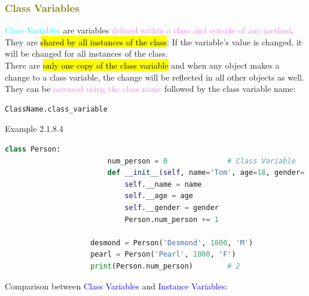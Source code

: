 \documentclass{book}
\begin{document}
    \textcolor{olive}{\subsubsection{Class Variables}}
    \textcolor{cyan}{Class Variables} are variables \textcolor{violet}{defined within a class and outside of any method}.\\
    They are \hl{shared by all instances of the class}: If the variable's value is changed, it will be changed for all instances of the class.\\
    There are \hl{only one copy of the class variable} and when any object makes a change to a class variable, the change will be reflected in all other objects as well.\\
    They can be \textcolor{violet}{accessed using the class name} followed by the class variable name:
    \begin{lstlisting}[language=Python, basicstyle=\ttfamily\small, keywordstyle=\color{blue}, commentstyle=\color{forestgreen}, stringstyle=\color{red}, showstringspaces=false]
                                    ClassName.class_variable
    \end{lstlisting}
    \newpage
    \begin{egBox}[]{Example 2.1.8.4}{}
    \begin{lstlisting}[language=Python, basicstyle=\ttfamily\small, keywordstyle=\color{blue}, commentstyle=\color{forestgreen}, stringstyle=\color{red}, showstringspaces=false]
                    class Person:
                        num_person = 0              # Class Variable
                        def __init__(self, name='Tom', age=18, gender='M'):
                            self.__name = name
                            self.__age = age
                            self.__gender = gender
                            Person.num_person += 1
                        
                    desmond = Person('Desmond', 1000, 'M')
                    pearl = Person('Pearl', 1000, 'F')
                    print(Person.num_person)        # 2
    \end{lstlisting}
    \end{egBox}
    \small Comparison between \textcolor{blue}{Class Variables} and \textcolor{blue}{Instance Variables}:
\end{document}
